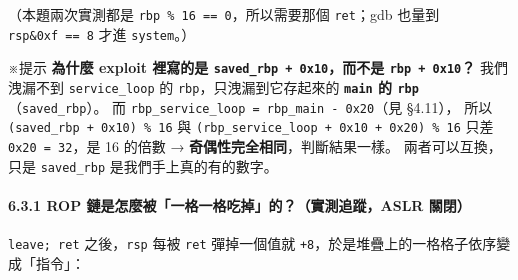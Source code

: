 \documentclass[10pt,a4paper]{article}
\renewenvironment{quote}{%
  \begin{mdframed}[linewidth=0pt,innerleftmargin=0pt,innerrightmargin=0pt,
    innerbottommargin=0pt,innertopmargin=0pt,skipabove=0.55em,skipbelow=0.55em,
    leftmargin=0.9em,rightmargin=0.4em,startcode={\color{quotebar}\vrule width 2.6pt},%
    endcode={}]%
  \itshape\color{black}%
}{%
  \end{mdframed}%
}
\begin{document}
（本題兩次實測都是 \texttt{rbp\ \allowbreak{}\%\allowbreak{}\ \allowbreak{}16\ \allowbreak{}==\ \allowbreak{}0}，所以需要那個
\texttt{ret}；gdb 也量到 \texttt{rsp\&\allowbreak{}0xf\ \allowbreak{}==\ \allowbreak{}8} 才進
\texttt{system}。）

\begin{quote}
※提示 \textbf{為什麼 exploit 裡寫的是
\texttt{saved\_\allowbreak{}rbp\ \allowbreak{}+\ \allowbreak{}0x10}，而不是 \texttt{rbp\ \allowbreak{}+\ \allowbreak{}0x10}？}
我們洩漏不到 \texttt{service\_\allowbreak{}loop} 的 \texttt{rbp}，只洩漏到它存起來的
\textbf{\texttt{main} 的 \texttt{rbp}}（\texttt{saved\_\allowbreak{}rbp}）。 而
\texttt{rbp\_\allowbreak{}service\_\allowbreak{}loop\ \allowbreak{}=\ \allowbreak{}rbp\_\allowbreak{}main\ \allowbreak{}-\allowbreak{}\ \allowbreak{}0x20}（見 §4.11）， 所以
\texttt{(saved\_\allowbreak{}rbp\ \allowbreak{}+\ \allowbreak{}0x10)\ \allowbreak{}\%\allowbreak{}\ \allowbreak{}16} 與
\texttt{(rbp\_\allowbreak{}service\_\allowbreak{}loop\ \allowbreak{}+\ \allowbreak{}0x10\ \allowbreak{}+\ \allowbreak{}0x20)\ \allowbreak{}\%\allowbreak{}\ \allowbreak{}16} 只差
\texttt{0x20\ \allowbreak{}=\ \allowbreak{}32}，是 16 的倍數 →
\textbf{奇偶性完全相同}，判斷結果一樣。 兩者可以互換，只是
\texttt{saved\_\allowbreak{}rbp} 是我們手上真的有的數字。
\end{quote}

\paragraph{6.3.1 ROP 鏈是怎麼被「一格一格吃掉」的？（實測追蹤，ASLR
關閉）}\label{rop-ux93c8ux662fux600eux9ebcux88abux4e00ux683cux4e00ux683cux5403ux6389ux7684ux5be6ux6e2cux8ffdux8e64aslr-ux95dcux9589}

\texttt{leave;\ \allowbreak{}ret} 之後，\texttt{rsp} 每被 \texttt{ret} 彈掉一個值就
\texttt{+8}，於是堆疊上的一格格子依序變成「指令」：
\end{document}
